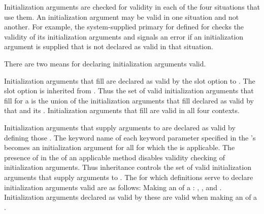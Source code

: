 \endsubsection%


Initialization arguments are checked for validity in each of the four
situations that use them.  An initialization argument may be valid in
one situation and not another. For example, the system-supplied     
primary  for  defined for 
 checks the validity of its initialization arguments
and signals an error if an initialization argument is supplied that is
not declared as valid in that situation.


There are two means for declaring initialization arguments valid.

\beginlist

\itemitem{\bull}
Initialization arguments that fill  are declared as valid
by the  slot option to .  The
 slot option is inherited from .  Thus
the set of valid initialization arguments that fill  for a
 is the union of the initialization arguments that fill
 declared as valid by that  and its
.  Initialization arguments that fill 
are valid in all four contexts.

\itemitem{\bull}
Initialization arguments that supply arguments to  are
declared as valid by defining those .  The keyword name of
each keyword parameter specified in the 's 
 becomes an initialization argument for all  
for which the  is applicable.
The presence of {\allowotherkeys} in the
 of an applicable method disables validity checking of 
initialization arguments.
Thus  inheritance
controls the set of valid initialization arguments that supply arguments
to .  The  for which 
definitions serve to declare initialization arguments valid are as
follows:
\beginlist                                              
\itemitem{--}
Making an  of a :
, , and
.  Initialization arguments declared as valid
by these  are valid when making 
an  of a .

